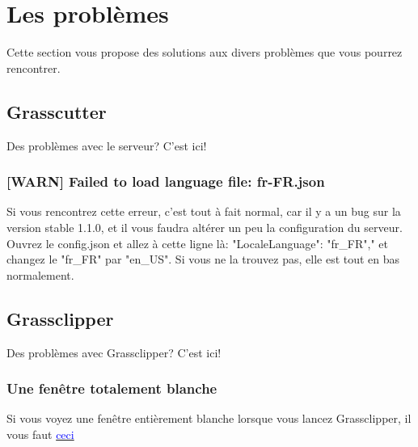 \documentclass{article}
\begin{document}
\hrulefill

\section{Les problèmes}
Cette section vous propose des solutions aux divers problèmes que vous pourrez rencontrer.

\subsection{Grasscutter}
Des problèmes avec le serveur? C'est ici!

\subsubsection{[WARN] Failed to load language file: fr-FR.json}
Si vous rencontrez cette erreur, c'est tout à fait normal, car il y a un bug sur la version stable 1.1.0, et il vous faudra altérer un peu la configuration du serveur.\newline
Ouvrez le config.json et allez à cette ligne là: "LocaleLanguage": "fr\_FR"," et changez le "fr\_FR" par "en\_US".\newline
Si vous ne la trouvez pas, elle est tout en bas normalement.

\subsection{Grassclipper}
Des problèmes avec Grassclipper? C'est ici!

\subsubsection{Une fenêtre totalement blanche}
Si vous voyez une fenêtre entièrement blanche lorsque vous lancez Grassclipper, il vous faut \href{https://developer.microsoft.com/en-us/microsoft-edge/webview2/#download}{\textcolor{blue}{ceci}}
\end{document}
